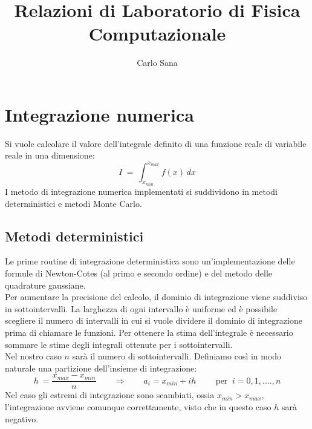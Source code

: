 
\title{Relazioni di Laboratorio di Fisica Computazionale}
\author{Carlo Sana}

\maketitle
\tableofcontents
\chapter{Integrazione numerica}
Si vuole calcolare il valore dell'integrale definito di una funzione reale di variabile reale in una dimensione:
$$
 	I \ = \ \int_{x_{min}}^{x_{max}} f(x) \, dx
$$
I metodo di integrazione numerica implementati si suddividono in metodi deterministici e  metodi Monte Carlo.
\section{Metodi deterministici}
Le prime routine di integrazione deterministica sono un'implementazione delle formule di Newton-Cotes (al primo e secondo ordine) e del metodo delle quadrature gaussiane.\\
Per aumentare la precisione del calcolo, il dominio di integrazione viene suddiviso in sottointervalli.
La larghezza di ogni intervallo è uniforme ed è possibile scegliere il numero di intervalli in cui
si vuole dividere il dominio di integrazione prima di chiamare le funzioni.
Per ottenere la stima dell'integrale è necessario sommare le stime degli integrali ottenute per i sottointervalli.\\
Nel nostro caso $n$ sarà il numero di sottointervalli. Definiamo così in modo naturale una partizione dell'insieme di integrazione:
$$
	h \ = \frac{x_{max} - x_{min}}{ n} \qquad \Longrightarrow \qquad a_i = x_{min} + i h  \qquad
	\mbox{ per } \ i = 0,1,....,n 
$$
Nel caso gli estremi di integrazione sono scambiati, ossia $x_{min} > x_{max}$, l'integrazione avviene comunque correttamente,
visto che in questo caso $h$ sarà negativo.
